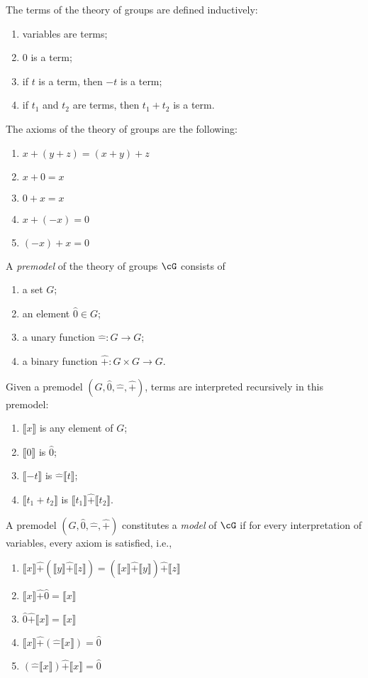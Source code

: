 \documentclass{amsart}
\newcommand{\interp}[1]{\llbracket #1 \rrbracket}
\begin{document}
The terms of the theory of groups are defined inductively:
\begin{enumerate}
\item variables are terms;
\item $0$ is a term;
\item if $t$ is a term, then $-t$ is a term;
\item if $t_{1}$ and $t_{2}$ are terms, then $t_{1} + t_{2}$ is a term.
\end{enumerate}

The axioms of the theory of groups are the following:
\begin{enumerate}
\item $x + (y + z) = (x + y) + z$
\item $x + 0 = x$
\item $0 + x = x$
\item $x + (-x) = 0$
\item $(-x) + x = 0$
\end{enumerate}

\begin{defn}
  A \emph{premodel} of the theory of groups $\cG$ consists of
  \begin{enumerate}
  \item a set $G$;
  \item an element $\hat{0} \in G$;
  \item a unary function $\hat{-} : G \to G$;
  \item a binary function $\hat{+} : G \times G \to G$.
  \end{enumerate}
\end{defn}

Given a premodel $(G, \hat{0}, \hat{-}, \hat{+})$, terms are interpreted recursively in this premodel:
\begin{enumerate}
\item $\interp{x}$ is any element of $G$;
\item $\interp{0}$ is $\hat{0}$;
\item $\interp{-t}$ is $\hat{-}\interp{t}$;
\item $\interp{t_{1} + t_{2}}$ is $\interp{t_{1}} \hat{+} \interp{t_{2}}$.
\end{enumerate}

\begin{defn}
  A premodel $(G, \hat{0}, \hat{-}, \hat{+})$ constitutes a \emph{model} of $\cG$ if for every interpretation of variables, every axiom is satisfied, i.e.,
  \begin{enumerate}
  \item $\interp{x} \hat{+} (\interp{y} \hat{+} \interp{z}) = (\interp{x} \hat{+} \interp{y}) \hat{+} \interp{z}$
  \item $\interp{x} \hat{+} \hat{0} = \interp{x}$
  \item $\hat{0} \hat{+} \interp{x} = \interp{x}$
  \item $\interp{x} \hat{+} (\hat{-}\interp{x}) = \hat{0}$
  \item $(\hat{-}\interp{x}) \hat{+} \interp{x} = \hat{0}$
  \end{enumerate}
\end{defn}
\end{document}

